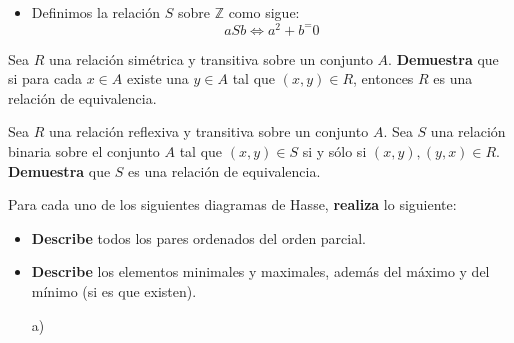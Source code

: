 \documentclass[oneside]{style}
\begin{document}
\begin{questions}[label=\protect\circled{\bfseries\arabic*}]
{\begin{itemize}
            \item Definimos la relación $S$ sobre $\mathbb{Z}$ como 
            sigue:
            \begin{equation*}
                aSb \Leftrightarrow a^2 + b^ = 0
            \end{equation*}
        \end{itemize}
    }

    \question
    {
        Sea $R$ una relación simétrica y transitiva sobre un conjunto $A$. 
        \textbf{Demuestra} que si para cada $x \in A$ existe una $y \in A$ 
        tal que $(x,y) \in R$, entonces $R$ es una relación de equivalencia. 
    }

    \question
    {
        Sea $R$ una relación reflexiva y transitiva sobre un conjunto $A$. Sea
        $S$ una relación binaria sobre el conjunto $A$ tal que $(x,y) \in S$ si 
        y sólo si $(x,y), (y,x) \in R$. \textbf{Demuestra} que $S$ es una 
        relación de equivalencia. 
    }

    \question
    {
        Para cada uno de los siguientes diagramas de Hasse, \textbf{realiza} 
        lo siguiente:
        \begin{itemize}
            \item \textbf{Describe} todos los pares ordenados del orden 
            parcial. 
            \item \textbf{Describe} los elementos minimales y maximales, 
            además del máximo y del mínimo (si es que existen). 
        \end{itemize}

        \begin{multicols}{3}
            \begin{itemize}
                \item[a)]  

    

\end{itemize}
\end{multicols}}
\end{questions}
\end{document}
